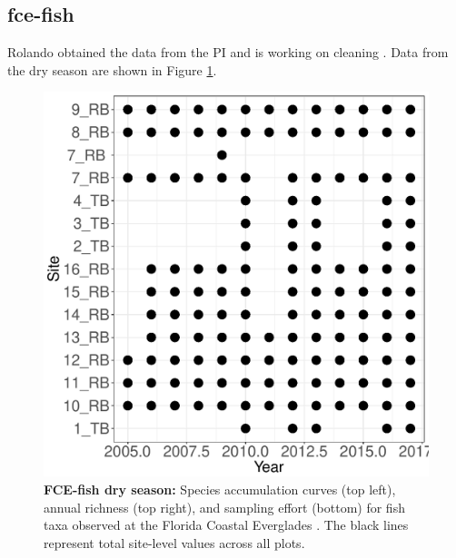 \documentclass[11pt, oneside]{article}
\begin{document}
\subsection {fce-fish}
Rolando obtained the data from the PI and is working on cleaning \citep{fce-fish}.
Data from the dry season are shown in Figure \ref{fce-fish-dry}.
\begin{figure}[h!]
\centering
\includegraphics[scale = 0.4]{fce-fish-Rehage_spatiotemporal_sampling_effort.pdf}
\caption{{\bf FCE-fish dry season:} Species accumulation curves (top left),  annual richness (top right), and sampling effort (bottom)  for fish taxa observed at the Florida Coastal Everglades . The black lines represent total site-level values across all plots.}
\label{fce-fish-dry}
\end{figure}
\end{document}
